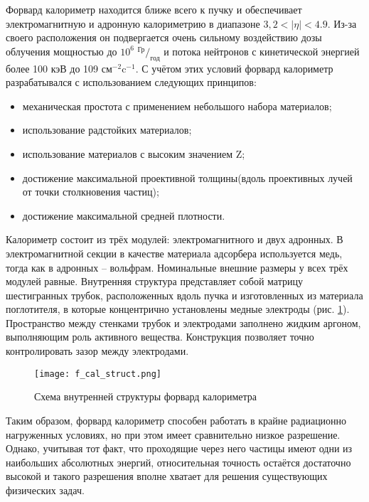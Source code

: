Форвард калориметр находится ближе всего к пучку и обеспечивает электромагнитную и адронную калориметрию в диапазоне $3,2 < |\eta| < 4.9$. Из-за своего расположения он подвергается очень сильному воздействию дозы облучения мощностью до $10^6$ ${^\text{Гр}} / _\text{год}$ и потока нейтронов с кинетической энергией более 100 кэВ до 109 $\text{см}^{-2}\text{c}^{-1}$\parencite{tdr_old}. С учётом этих условий форвард калориметр разрабатывался с использованием следующих принципов:
\begin{itemize}
    \item механическая простота с применением небольшого набора материалов;
    \item использование радстойких материалов;
    \item использование материалов с высоким значением Z;
    \item достижение максимальной проективной толщины(вдоль проективных лучей от точки столкновения частиц);
    \item достижение максимальной средней плотности.
\end{itemize}\par
Калориметр состоит из трёх модулей: электромагнитного и двух адронных. В электромагнитной секции в качестве материала адсорбера используется медь, тогда как в адронных -- вольфрам. Номинальные внешние размеры у всех трёх модулей равные. Внутренняя структура представляет собой матрицу шестигранных трубок, расположенных вдоль пучка и изготовленных из материала поглотителя, в которые концентрично установлены медные электроды (рис. \ref{fig:f_cal_struct}). Пространство между стенками трубок и электродами заполнено жидким аргоном, выполняющим роль активного вещества. Конструкция позволяет точно контролировать зазор между электродами.
\begin{figure}[ht]
    \centering
    \texttt{[image: f\_cal\_struct.png]}
    \caption{Схема внутренней структуры форвард калориметра\parencite{tdr_old}}
    \label{fig:f_cal_struct}
\end{figure}\par
Таким образом, форвард калориметр способен работать в крайне радиационно нагруженных условиях, но при этом имеет сравнительно низкое разрешение. Однако, учитывая тот факт, что проходящие через него частицы имеют одни из наибольших абсолютных энергий, относительная точность остаётся достаточно высокой и такого разрешения вполне хватает для решения существующих физических задач.
